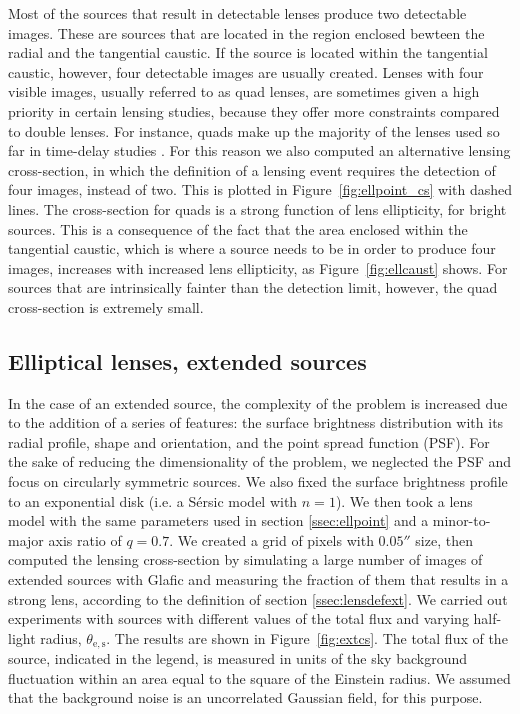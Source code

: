 \documentclass{aa}
\def\Fref#1{Figure~\ref{#1}\xspace}
\begin{document}
Most of the sources that result in detectable lenses produce two detectable images. These are sources that are located in the region enclosed bewteen the radial and the tangential caustic. 
If the source is located within the tangential caustic, however, four detectable images are usually created.
Lenses with four visible images, usually referred to as quad lenses, are sometimes given a high priority in certain lensing studies, because they offer more constraints compared to double lenses. For instance, quads make up the majority of the lenses used so far in time-delay studies \citep{Mil++20}.
For this reason we also computed an alternative lensing cross-section, in which the definition of a lensing event requires the detection of four images, instead of two.
This is plotted in \Fref{fig:ellpoint_cs} with dashed lines.
The cross-section for quads is a strong function of lens ellipticity, for bright sources.
This is a consequence of the fact that the area enclosed within the tangential caustic, which is where a source needs to be in order to produce four images, increases with increased lens ellipticity, as \Fref{fig:ellcaust} shows.
For sources that are intrinsically fainter than the detection limit, however, the quad cross-section is extremely small.


\subsection{Elliptical lenses, extended sources}\label{ssec:ellext}

In the case of an extended source, the complexity of the problem is increased due to the addition of a series of features: the surface brightness distribution with its radial profile, shape and orientation, and the point spread function (PSF). 
For the sake of reducing the dimensionality of the problem, we neglected the PSF and focus on circularly symmetric sources. We also fixed the surface brightness profile to an exponential disk (i.e. a S\'{e}rsic model with $n=1$).
We then took a lens model with the same parameters used in section \ref{ssec:ellpoint} and a minor-to-major axis ratio of $q=0.7$.
We created a grid of pixels with $0.05''$ size, then computed the lensing cross-section by simulating a large number of images of extended sources with {\sc Glafic} and measuring the fraction of them that results in a strong lens, according to the definition of section \ref{ssec:lensdefext}.
We carried out experiments with sources with different values of the total flux and varying half-light radius, $\theta_{\mathrm{e,s}}$.
The results are shown in \Fref{fig:extcs}.
The total flux of the source, indicated in the legend, is measured in units of the sky background fluctuation within an area equal to the square of the Einstein radius. We assumed that the background noise is an uncorrelated Gaussian field, for this purpose.
\end{document}
